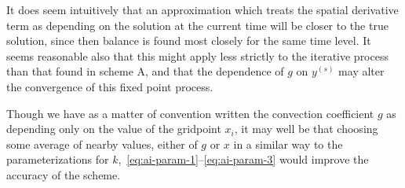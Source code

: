 \documentclass[12pt, reqno]{amsart}
\begin{document}
It does seem intuitively that an approximation which treats the spatial derivative term as depending on the solution at the current time will be closer to the true solution, since then balance is found most closely for the same time level.
It seems reasonable also that this might apply less strictly to the iterative process than that found in scheme A, and that the dependence of $g$ on $y^{(s)}$ may alter the convergence of this fixed point process.

Though we have as a matter of convention written the convection coefficient $g$ as depending only on the value of the gridpoint $x_{i}$, it may well be that choosing some average of nearby values, either of $g$ or $x$ in a similar way to the parameterizations for $k$,~\eqref{eq:ai-param-1}--\eqref{eq:ai-param-3} would improve the accuracy of the scheme.
\end{document}
